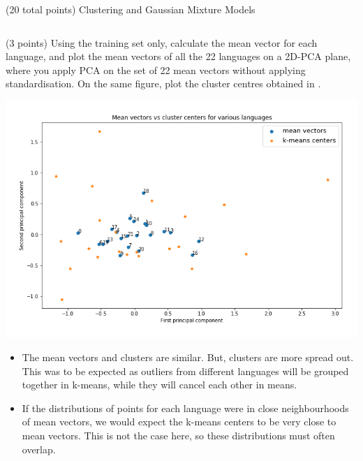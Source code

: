 \documentclass[12pt]{article}
\begin{document}
\begin{question}{(20 total points) Clustering and Gaussian Mixture Models}
\begin{subquestion}
\begin{answerbox}{35em}
\begin{center}
\begin{tabular}{|c|c|}
\hline 
\end{tabular} \end{center}
      \end{answerbox}
  


   \end{subquestion}
   \begin{subquestion}{(3 points)
       Using the training set only,
       calculate the mean vector for each language, and plot the mean
       vectors of all the 22 languages on a 2D-PCA plane, where you
       apply PCA on the set of 22 mean vectors without applying
       standardisation.  
       On the same figure, plot the cluster centres obtained in .
     } \label{Q3.2}

   

      \begin{answerbox}{35em}
                    \begin{center}
	\includegraphics[width=\textwidth]{imgs/3_2.png}
	\end{center}
	\begin{itemize}
	\itemsep -3pt {}
	\item The mean vectors and clusters are similar. But, clusters are more spread out. This was to be expected as outliers from different languages will be grouped together in k-means, while they will cancel each other in means.
	\item If the distributions of points for each language were in close neighbourhoods of  mean vectors, we would expect the k-means centers to be very close to mean vectors. This is not the case here, so these distributions must often overlap.
	\end{itemize}
      \end{answerbox}
  



\end{subquestion}
\end{question}
\end{document}
